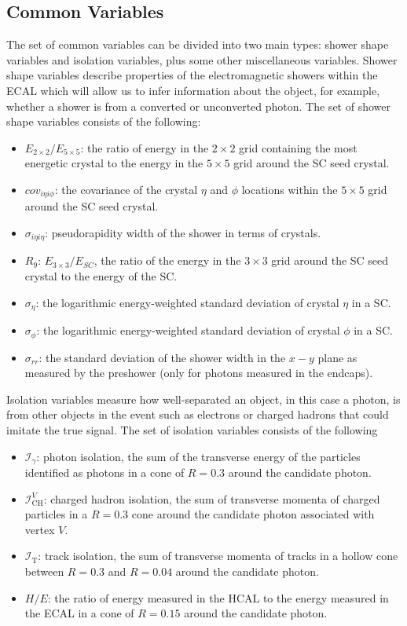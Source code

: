 \subsection{Common Variables}
The set of common variables can be divided into two main types: shower shape variables and isolation variables, plus some other miscellaneous variables. 
Shower shape variables describe properties of the electromagnetic showers within the ECAL which will allow us to infer information about the object, for example, whether a shower is from a converted or unconverted photon.
The set of shower shape variables consists of the following:
\begin{itemize}[noitemsep]
    \item $E_{2\times{}2}/E_{5\times{}5}$: the ratio of energy in the $2\times{}2$ grid containing the most energetic crystal to the energy in the $5\times{}5$ grid around the SC seed crystal.
    \item $cov_{i\eta{i}\phi}$: the covariance of the crystal $\eta$ and $\phi$ locations within the $5\times{}5$ grid around the SC seed crystal. 
    \item $\sigma_{i\eta{}i\eta}$: pseudorapidity width of the shower in terms of crystals. 
    \item $R_{9}$: $E_{3\times{}3}/E_{SC}$, the ratio of the energy in the $3\times{}3$ grid around the SC seed crystal to the energy of the SC.
    \item $\sigma_{\eta}$: the logarithmic energy-weighted standard deviation of crystal $\eta$ in a SC.
    \item $\sigma_{\phi}$: the logarithmic energy-weighted standard deviation of crystal $\phi$ in a SC.
    \item $\sigma_{rr}$: the standard deviation of the shower width in the $x-y$ plane as measured by the preshower (only for photons measured in the endcaps).
\end{itemize}


Isolation variables measure how well-separated an object, in this case a photon, is from other objects in the event such as electrons or charged hadrons that could imitate the true signal. The set of isolation variables consists of the following
\begin{itemize}[noitemsep]
    \item $\mathcal{I}_{\gamma}$: photon isolation, the sum of the transverse energy of the particles identified as photons in a cone of $R=0.3$ around the candidate photon.
    \item $\mathcal{I}^{V}_{\mathrm{CH}}$: charged hadron isolation, the sum of transverse momenta of charged particles in a $R=0.3$ cone around the candidate photon associated with vertex $V$. 
    \item $\mathcal{I}_{\mathrm{T}}$: track isolation, the sum of transverse momenta of tracks in a hollow cone between $R=0.3$ and $R=0.04$ around the candidate photon.
    \item $H/E$: the ratio of energy measured in the HCAL to the energy measured in the ECAL in a cone of $R=0.15$ around the candidate photon.
\end{itemize}

